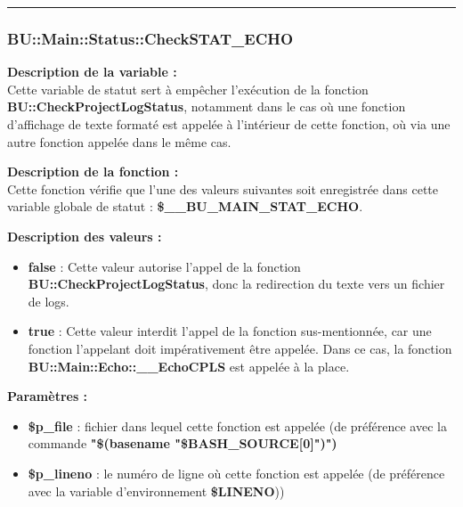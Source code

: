 \documentclass[a4paper,10pt]{article}
\begin{document}

\color{blue}\par\noindent\rule{\textwidth}{0.4pt}\color{white}

\color{blue}
\subsubsection{\color{mauve}BU::Main::Status::CheckSTAT\_ECHO}\color{white}

\begin{justify}
    \textbf{Description de la variable :}\\
    Cette variable de statut sert à empêcher l'exécution de la fonction \textbf{\color{mauve}BU::CheckProjectLogStatus}, notamment dans le cas où une fonction d'affichage de texte formaté est appelée à l'intérieur de cette fonction, où via une autre fonction appelée dans le même cas.
\end{justify}

\begin{justify}
    \textbf{Description de la fonction :}\\
    Cette fonction vérifie que l'une des valeurs suivantes soit enregistrée dans cette variable globale de statut : \textbf{\color{orange}\$\_\_BU\_MAIN\_STAT\_ECHO}.
\end{justify}

\begin{justify}
    \textbf{Description des valeurs :}

    \begin{itemize}
        \item \textbf{false} : Cette valeur autorise l'appel de la fonction \textbf{\color{mauve}BU::CheckProjectLogStatus}, donc la redirection du texte vers un fichier de logs.\\

        \item \textbf{true} : Cette valeur interdit l'appel de la fonction sus-mentionnée, car une fonction l'appelant doit impérativement être appelée. Dans ce cas, la fonction \textbf{\color{mauve}BU::Main::Echo::\_\_EchoCPLS} est appelée à la place.
    \end{itemize}

\end{justify}

\begin{justify}
    \textbf{Paramètres :}

    \begin{itemize}
        \item \color{orange}\textbf{\$p\_file}\color{white} : fichier dans lequel cette fonction est appelée (de préférence avec la commande \textbf{"\$(\color{gray}basename \color{white}"\color{orange}\$BASH\_SOURCE[0]\color{white}")")}\\

        \item \color{orange}\textbf{\$p\_lineno}\color{white} : le numéro de ligne où cette fonction est appelée (de préférence avec la variable d'environnement \textbf{\color{orange}\$LINENO}))
    \end{itemize}
\end{justify}
\end{document}
